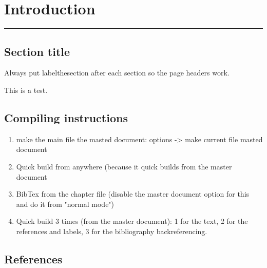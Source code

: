 \chapter{Introduction}
\label{\thechapter}
\label{Introduction}


\rule{\textwidth}{1.6pt}
\minitoc
\clearpage


\section{Section title}
\label{\thesection}

Always put label{thesection} after each section so the page headers work. \cite{Selmeczi_07}

This is a test. 

\section{Compiling instructions}

\begin{enumerate}
\item make the main file the masted document: options -> make current file masted document

\item Quick build from anywhere (because it quick builds from the master document

\item BibTex from the chapter file (disable the master document option for this and do it from "normal mode")

\item Quick build 3 times (from the master document): 1 for the text, 2 for the references and labels, 3 for the bibliography backreferencing.
\end{enumerate}


\section{References}
\label{\thesection}
\vspace{-1.5cm}


